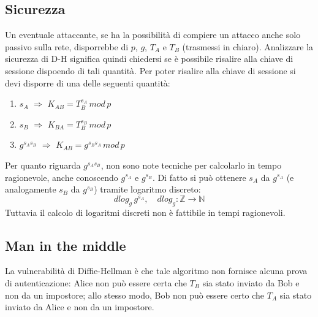 \subsection{Sicurezza}
Un eventuale attaccante, se ha la possibilità di compiere un attacco anche solo passivo sulla rete, disporrebbe di $p$, $g$, $T_{A}$ e $T_{B}$ (trasmessi in chiaro). Analizzare la sicurezza di D-H significa quindi chiedersi se è possibile risalire alla chiave di sessione dispoendo di tali quantità.
\newline \newline
Per poter risalire alla chiave di sessione si devi disporre di una delle seguenti quantità:
\begin{enumerate}
\item $s_{A}$ $\Rightarrow$ $K_{AB}=T_{B}^{s_{A}} \, mod \,p$
\item $s_{B}$ $\Rightarrow$ $K_{BA}=T_{B}^{s_{B}} \, mod \, p$
\item $g^{s_{A}s_{B}}$ $\Rightarrow$  $K_{AB} = g^{s_{B}s_{A}} \, mod \, p$
\end{enumerate}
Per quanto riguarda $g^{s_{A}s_{B}}$, non sono note tecniche per calcolarlo in tempo ragionevole, anche conoscendo $g^{s_{A}}$ e $g^{s_{B}}$. 
\newline \newline
Di fatto si può ottenere $s_{A}$ da $g^{s_{A}}$ (e analogamente $s_{B}$ da $g^{s_{B}}$) tramite logaritmo discreto:
\begin{equation}
dlog_{g} \, g^{s_{A}}, \quad dlog_{g}: \mathbb{Z} \rightarrow \mathbb{N}
\end{equation} 
Tuttavia il calcolo di logaritmi discreti non è fattibile in tempi ragionevoli.

\subsection{Man in the middle}
La vulnerabilità di Diffie-Hellman è che tale algoritmo non fornisce alcuna prova di autenticazione: Alice non può essere certa che $T_{B}$ sia stato inviato da Bob e non da un impostore; allo stesso modo, Bob non può essere certo che $T_{A}$ sia stato inviato da Alice e non da un impostore. 

